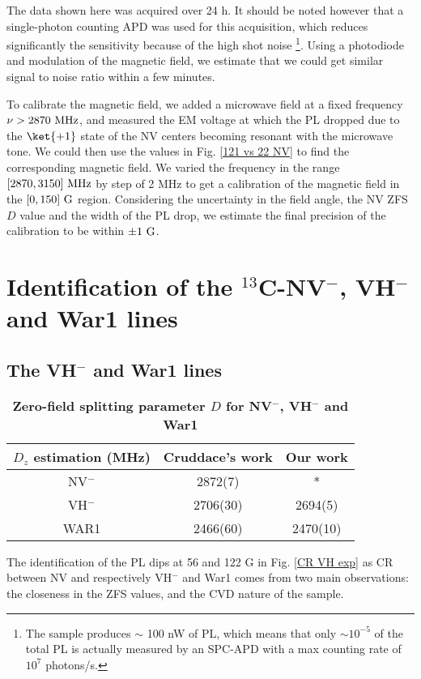 \documentclass[a4paper, 11pt]{book}
\begin{document}
The data shown here was acquired over 24 h. It should be noted however that a single-photon counting APD was used for this acquisition, which reduces significantly the sensitivity because of the high shot noise \footnote{The sample produces $\sim$ 100 nW of PL, which means that only $\sim 10^{-5}$ of the total PL is actually measured by an SPC-APD with a max counting rate of $10^7$ photons/s.}. Using a photodiode and modulation of the magnetic field, we estimate that we could get similar signal to noise ratio within a few minutes.

To calibrate the magnetic field, we added a microwave field at a  fixed frequency $\nu > 2870\ \rm MHz$, and measured the EM voltage at which the PL dropped due to the $\ket{+1}$ state of the NV centers becoming resonant with the microwave tone. We could then use the values in Fig. \ref{121 vs 22 NV} to find the corresponding magnetic field. We varied the frequency in the range  $[2870,3150]\ \rm MHz$ by step of 2 MHz to get a calibration of the magnetic field in the $[0,150]\ \rm G$ region. Considering the uncertainty in the field angle, the NV ZFS $D$ value and the width of the PL drop, we estimate the final precision of the calibration to be within $\pm 1\ \rm G$.

\section{Identification of the $^{13}$C-NV$^-$, VH$^-$ and War1 lines}

\subsection{The VH$^-$ and War1 lines}
\begin{table}[htbp]
\centering
\caption{\bf Zero-field splitting parameter $D$ for NV$^-$, VH$^-$ and War1}
\begin{tabular}{ccc}
\hline
$D_z$ estimation (MHz) & Cruddace's work\citep{cruddace2007magnetic} & Our work \\
\hline
NV$^-$ & 2872(7) & * \\
VH$^-$ & 2706(30) & 2694(5)  \\
WAR1 & 2466(60) & 2470(10) \\
\hline
\end{tabular}
  \label{table VH et War1}
\end{table}

The identification of the PL dips at 56 and 122 G in Fig. \ref{CR VH exp} as CR between NV and respectively VH$^-$ and War1 comes from two main observations: the closeness in the ZFS values, and the CVD nature of the sample.
\end{document}
